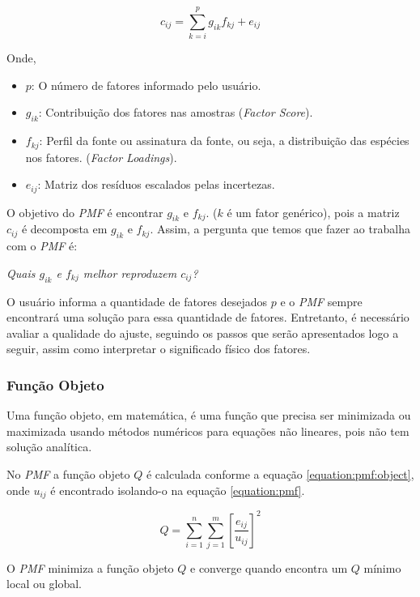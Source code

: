 \begin{equation}
  c_{ij} = \sum_{k=i}^p g_{ik}f_{kj} + e_{ij}
  \label{equation:pmf}
\end{equation}

Onde,
\begin{itemize}
  \item $p$: O número de fatores informado pelo usuário.
  \item $g_{ik}$: Contribuição dos fatores nas amostras (\textit{Factor Score}).
  \item $f_{kj}$: Perfil da fonte ou assinatura da fonte, ou seja, 
        a distribuição das espécies nos fatores. (\textit{Factor Loadings}).
  \item $e_{ij}$: Matriz dos resíduos escalados pelas incertezas.
\end{itemize}

O objetivo do \textit{PMF} é encontrar $g_{ik}$ e $f_{kj}$. 
($k$ é um fator genérico), pois a matriz $c_{ij}$ é decomposta em 
$g_{ik}$ e $f_{kj}$. Assim, a pergunta que temos que fazer ao trabalha com 
o \textit{PMF} é: 

\textit{Quais $g_{ik}$ e $f_{kj}$ melhor reproduzem $c_{ij}$?}

O usuário informa a quantidade de fatores desejados $p$ e o \textit{PMF} 
sempre encontrará uma solução para essa quantidade de fatores. 
Entretanto, é necessário avaliar a qualidade do ajuste, seguindo os passos 
que serão apresentados logo a seguir, assim como interpretar o significado 
físico dos fatores. 

\subsubsection{Função Objeto}

Uma função objeto, em matemática, é uma função que precisa ser minimizada 
ou maximizada usando métodos numéricos para equações não lineares, pois não 
tem solução analítica. 

No \textit{PMF} a função objeto $Q$ é calculada conforme a equação 
\ref{equation:pmf:object}, onde ${u_{ij}}$ é encontrado isolando-o na 
equação \ref{equation:pmf}.

\begin{equation}
  Q = \sum_{i=1}^n \sum_{j=1}^m  \left[ \frac{e_{ij}} {u_{ij}} \right] ^2
  \label{equation:pmf:object}
\end{equation}

O \textit{PMF} minimiza a função objeto $Q$ e converge quando encontra um $Q$ 
mínimo local ou global. 

